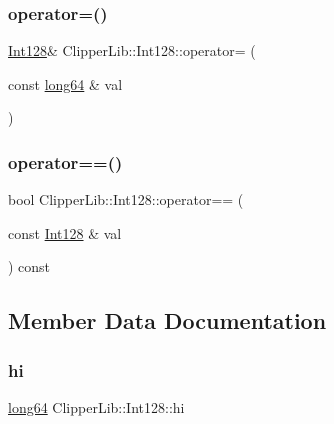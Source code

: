 \mbox{\label{class_clipper_lib_1_1_int128_a908b1ffab7e190f8db9d2adccbb9eef4}} 
\subsubsection{\texorpdfstring{operator=()}{operator=()}}
{\footnotesize\ttfamily \mbox{\hyperlink{class_clipper_lib_1_1_int128}{Int128}}\& Clipper\+Lib\+::\+Int128\+::operator= (\begin{DoxyParamCaption}\item[{const \mbox{\hyperlink{namespace_clipper_lib_a7fd564bf34d174b6c96e07d01e5e7a0a}{long64}} \&}]{val }\end{DoxyParamCaption})\hspace{0.3cm}{\ttfamily [inline]}}

\mbox{\label{class_clipper_lib_1_1_int128_a8946a96471d06371fd5ea4f4f65cb4c9}} 
\subsubsection{\texorpdfstring{operator==()}{operator==()}}
{\footnotesize\ttfamily bool Clipper\+Lib\+::\+Int128\+::operator== (\begin{DoxyParamCaption}\item[{const \mbox{\hyperlink{class_clipper_lib_1_1_int128}{Int128}} \&}]{val }\end{DoxyParamCaption}) const\hspace{0.3cm}{\ttfamily [inline]}}



\subsection{Member Data Documentation}
\mbox{\label{class_clipper_lib_1_1_int128_a167643d0860a14fb563e055511e15e14}} 
\subsubsection{\texorpdfstring{hi}{hi}}
{\footnotesize\ttfamily \mbox{\hyperlink{namespace_clipper_lib_a7fd564bf34d174b6c96e07d01e5e7a0a}{long64}} Clipper\+Lib\+::\+Int128\+::hi}

